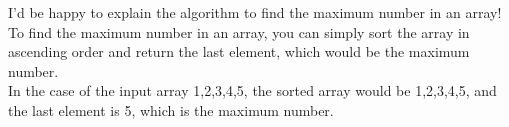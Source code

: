 \documentclass[preview]{standalone}
\begin{document}
I'd be happy to explain the algorithm to find the maximum number in an array!\\To find the maximum number in an array, you can simply sort the array in ascending order and return the last element, which would be the maximum number.\\In the case of the input array 1,2,3,4,5, the sorted array would be 1,2,3,4,5, and the last element is 5, which is the maximum number.\\
\end{document}
